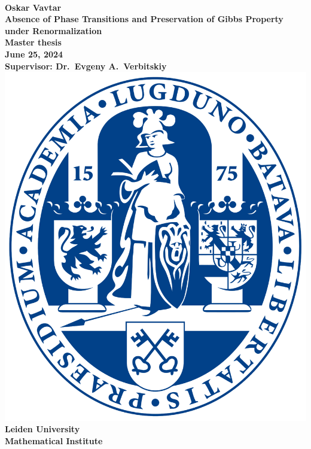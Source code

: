 \documentclass[12pt]{article}
\newcommand{\1}{\mathbbm{1}}
\newcommand{\5}{\vspace{0.5cm}}
\theoremstyle{definition}
\begin{document}
\begin{center}
~\\
\vspace{2cm}
\Large{\textbf{Oskar Vavtar}} \\
\vspace{2cm}
\LARGE{\textbf{Absence of Phase Transitions and Preservation of Gibbs Property under Renormalization}} \\
\vspace{3cm}
\large{\textbf{Master thesis\\\vspace{0.2cm} June 25, 2024}}
\vspace{3cm}\\
\large{\textbf{Supervisor: Dr.~Evgeny A.~Verbitskiy}} \\
\vspace{2cm}
\includegraphics[scale=0.07]{leiden_logo}\\
\large{\textbf{Leiden University\\
Mathematical Institute}}
\end{center}
\pagebreak

\end{document}
